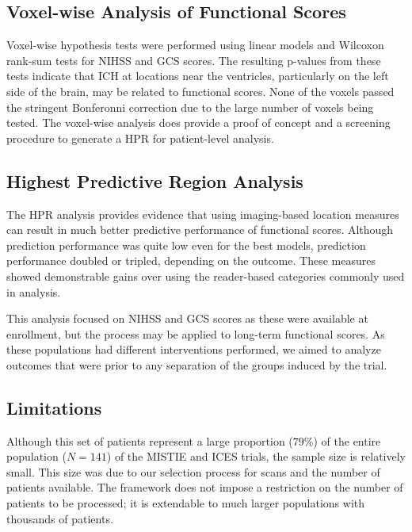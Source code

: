\documentclass[10pt]{article}\usepackage[]{graphicx}\usepackage[]{color}
\begin{document}
\subsection{Voxel-wise Analysis of Functional Scores}

Voxel-wise hypothesis tests were performed using linear models and Wilcoxon rank-sum tests for NIHSS and GCS scores.  The resulting p-values from these tests indicate that ICH at locations near the ventricles, particularly on the left side of the brain, may be related to functional scores.  
None of the voxels passed the stringent  Bonferonni correction due to the large number of voxels being tested. The voxel-wise analysis does provide a proof of concept and a screening procedure to generate a HPR for patient-level analysis.

\subsection{Highest Predictive Region Analysis}

The HPR analysis provides evidence that using imaging-based location measures can result in much better predictive performance of functional scores.  Although prediction performance was quite low even for the best models, prediction performance doubled or tripled, depending on the outcome.  These measures showed demonstrable gains over using the reader-based categories commonly used in analysis.

This analysis focused on NIHSS and GCS scores as these were available at enrollment, but the process may be applied to long-term functional scores.  As these populations had different interventions performed, we aimed to analyze outcomes that were prior to any separation of the groups induced by the trial.  

\subsection{Limitations}

Although this set of patients represent a large proportion ($79$\%) of the entire population ($N=141$) of the MISTIE and ICES trials, the sample size is relatively small.  This size was due to our selection process for scans and the number of patients available.  The framework does not impose a restriction on the number of patients to be processed; it is extendable to much larger populations with thousands of patients.
\end{document}
